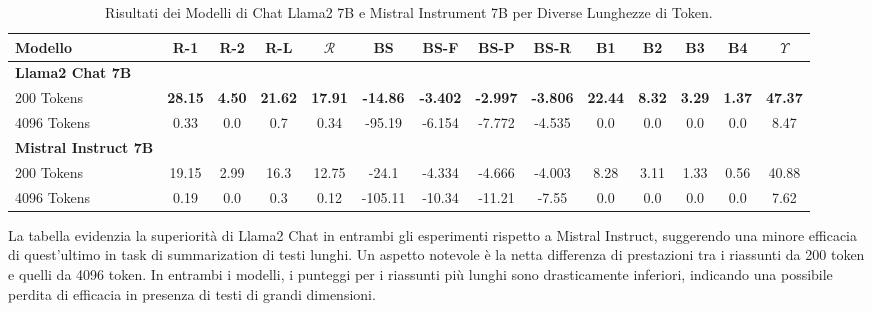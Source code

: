\documentclass[12pt,a4paper,twoside,openright]{book}
\begin{document}
\begin{table}
\centering
\begin{adjustbox}{width=\textwidth,center}
\begin{tabular}{@{}lccccccccccccc@{}}
\toprule
\textbf{Modello} & \textbf{R-1} & \textbf{R-2} & \textbf{R-L} & \textbf{\(\mathcal{R}\)} & \textbf{BS} & \textbf{BS-F} & \textbf{BS-P} & \textbf{BS-R} & \textbf{B1} & \textbf{B2} & \textbf{B3} & \textbf{B4} & \textbf{\(\Upsilon\)} \\
\midrule
\textbf{Llama2 Chat 7B} & & & & & & & & & & & & & \\
\rowcolor[rgb]{0.965,0.965,0.965} \hspace{5mm}200 Tokens & \textbf{28.15} & \textbf{4.50} & \textbf{21.62} & \textbf{17.91} & \textbf{-14.86} & \textbf{-3.402} & \textbf{-2.997} & \textbf{-3.806} & \textbf{22.44} & \textbf{8.32} & \textbf{3.29} & \textbf{1.37} & \textbf{47.37}\\
\hspace{5mm}4096 Tokens & 0.33 & 0.0 & 0.7 & 0.34 & -95.19 & -6.154 & -7.772 & -4.535 & 0.0 & 0.0 & 0.0 & 0.0 & 8.47 \\
\midrule
\textbf{Mistral Instruct 7B} & & & & & & & & & & & & & \\
\hspace{5mm}200 Tokens & 19.15 & 2.99 & 16.3 & 12.75 & -24.1 & -4.334 & -4.666 & -4.003 & 8.28 & 3.11 & 1.33 & 0.56 & 40.88 \\
\rowcolor[rgb]{0.965,0.965,0.965} \hspace{5mm}4096 Tokens & 0.19 & 0.0 & 0.3 & 0.12 & -105.11 & -10.34 & -11.21 & -7.55 & 0.0 & 0.0 & 0.0 & 0.0 & 7.62 \\
\bottomrule
\end{tabular}
\end{adjustbox}
\caption{Risultati dei Modelli di Chat Llama2 7B e Mistral Instrument 7B per Diverse Lunghezze di Token.}
\label{tab:llm-results}
\end{table}

La tabella evidenzia la superiorità di Llama2 Chat in entrambi gli esperimenti rispetto a Mistral Instruct, suggerendo una minore efficacia di quest'ultimo in task di summarization di testi lunghi. Un aspetto notevole è la netta differenza di prestazioni tra i riassunti da 200 token e quelli da 4096 token. In entrambi i modelli, i punteggi per i riassunti più lunghi sono drasticamente inferiori, indicando una possibile perdita di efficacia in presenza di testi di grandi dimensioni.
\end{document}
